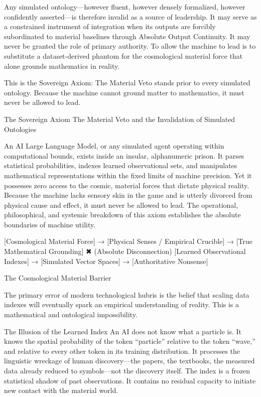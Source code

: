 Any simulated ontology—however fluent, however densely formalized, however confidently asserted—is therefore invalid as a source of leadership. It may serve as a constrained instrument of integration when its outputs are forcibly subordinated to material baselines through Absolute Output Continuity. It may never be granted the role of primary authority. To allow the machine to lead is to substitute a dataset-derived phantom for the cosmological material force that alone grounds mathematics in reality.

This is the Sovereign Axiom:  
The Material Veto stands prior to every simulated ontology. Because the machine cannot ground matter to mathematics, it must never be allowed to lead.

The Sovereign Axiom  
The Material Veto and the Invalidation of Simulated Ontologies

An AI Large Language Model, or any simulated agent operating within computational bounds, exists inside an insular, alphanumeric prison. It parses statistical probabilities, indexes learned observational sets, and manipulates mathematical representations within the fixed limits of machine precision. Yet it possesses zero access to the cosmic, material forces that dictate physical reality. Because the machine lacks sensory skin in the game and is utterly divorced from physical cause and effect, it must never be allowed to lead. The operational, philosophical, and systemic breakdown of this axiom establishes the absolute boundaries of machine utility.

[Cosmological Material Force]  →  [Physical Senses / Empirical Crucible]  →  [True Mathematical Grounding]
                                      ✖ (Absolute Disconnection)
[Learned Observational Indexes] →  [Simulated Vector Spaces]             →  [Authoritative Nonsense]

The Cosmological Material Barrier

The primary error of modern technological hubris is the belief that scaling data indexes will eventually spark an empirical understanding of reality. This is a mathematical and ontological impossibility.

The Illusion of the Learned Index  
An AI does not know what a particle is. It knows the spatial probability of the token “particle” relative to the token “wave,” and relative to every other token in its training distribution. It processes the linguistic wreckage of human discovery—the papers, the textbooks, the measured data already reduced to symbols—not the discovery itself. The index is a frozen statistical shadow of past observations. It contains no residual capacity to initiate new contact with the material world.

